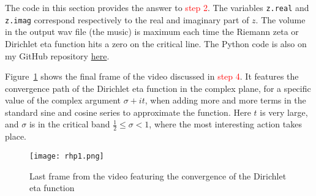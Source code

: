 \documentclass[oneside,10pt]{book}
\begin{document}
The code in this section provides the answer to \textcolor{red}{step 2}. The variables
 \texttt{z.real} and \texttt{z.imag} correspond respectively to the real and imaginary part of $z$.
The volume in the output wav file (the music) is maximum each time the Riemann zeta or  Dirichlet eta function hits a zero on the critical line. 
The Python code is also
 on my GitHub repository 
\href{https://github.com/VincentGranville/Experimental-Math-Number-Theory/blob/main/Source-Code/soundRH.py}{here}.

Figure~\ref{fig:fdxslbwavc} shows the final frame of the video discussed in \textcolor{red}{step 4}. It features the convergence path of the Dirichlet 
eta function in the complex plane, for a specific value of the complex argument $\sigma+it$, when adding more and more terms in  the standard sine and cosine series to approximate the function. Here $t$ is very large, and $\sigma$ is in the critical band $\frac{1}{2}\leq \sigma < 1$,
 where the most interesting action takes place.

\begin{figure}[H]
\centering
\texttt{[image: rhp1.png]}   
\caption{Last frame from the video featuring the convergence of the Dirichlet eta function}
\label{fig:fdxslbwavc}
\end{figure}
\end{document}
